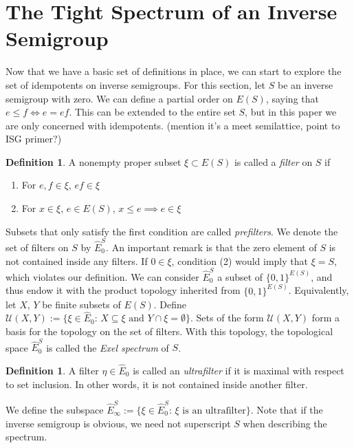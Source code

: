 \documentclass{article}
\theoremstyle{definition}
\newtheorem{definition}[theorem]{Definition}
\begin{document}

\section{The Tight Spectrum of an Inverse Semigroup}
Now that we have a basic set of definitions in place, we can start to explore
the set of idempotents on inverse semigroups. For this section, let $S$ be an
inverse semigroup with zero. We can define a partial order on $E(S)$, saying that $e \leq f \iff e = ef$.
This can be extended to the entire set $S$, but in this paper we are only concerned with idempotents.
(mention it's a meet semilattice, point to ISG primer?)

\begin{definition}
    A nonempty proper subset $\xi \subset E(S)$ is called a \textit{filter} on $S$ if
    \begin{enumerate}
        \item For $e, f \in \xi$, $ef \in \xi$
        \item For $x \in \xi$, $e \in E(S)$, $x \leq e \implies e \in \xi$
    \end{enumerate}
\end{definition}
Subsets that only satisfy the first condition are called \textit{prefilters}.
We denote the set of filters on $S$ by $\hat{E}_0^S$. 
An important remark is that the zero element of $S$ is not contained 
inside any filters. If $0 \in \xi$, condition (2) would imply that $\xi = S$,
which violates our definition. We can consider $\hat{E}_0^S$ a subset of $\{0, 1\}^{E(S)}$,
and thus endow it with the product topology inherited from $\{0, 1\}^{E(S)}$. Equivalently,
let $X$, $Y$ be finite subsets of $E(S)$. Define $\mathcal{U}(X, Y) := \{\xi \in \hat{E}_0\text{: } X \subseteq \xi \text{ and } Y \cap \xi = \emptyset\}$.
Sets of the form $\mathcal{U}(X, Y)$ form a basis for the topology on the set of filters. With this topology, the topological
space $\hat{E}_0^S$ is called the \textit{Exel spectrum} of $S$.

\begin{definition}
    A filter $\eta \in \hat{E}_0$ is called an \textit{ultrafilter} if it is 
    maximal with respect to set inclusion. In other words, it is not contained
    inside another filter.
\end{definition}
We define the subspace $\hat{E}_\infty^S := \{\xi \in \hat{E}_0^S\text{: $\xi$ is an ultrafilter}\}$. Note that if
the inverse semigroup is obvious, we need not superscript $S$ when describing the spectrum.
\end{document}
